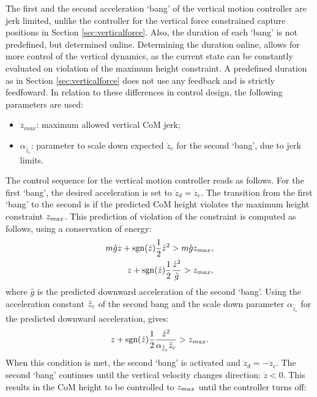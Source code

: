 The first and the second acceleration `bang' of the vertical motion controller are jerk limited, unlike the controller for the vertical force constrained capture positions in Section \ref{sec:verticalforce}. Also, the duration of each `bang' is not predefined, but determined online. Determining the duration online, allows for more control of the vertical dynamics, as the current state can be constantly evaluated on violation of the maximum height constraint. A predefined duration as in Section \ref{sec:verticalforce} does not use any feedback and is strictly feedfoward. In relation to these differences in control design, the following parameters are used:
\begin{itemize}
	\item $\dddot{z}_{max}$: maximum allowed vertical CoM jerk;
	\item $\alpha_{\hat{\ddot{z}}_{c}}$: parameter to scale down expected $\ddot{z}_c$ for the second `bang', due to jerk limits.
\end{itemize}
The control sequence for the vertical motion controller reads as follows. For the first `bang', the desired acceleration is set to $\ddot{z}_d=\ddot{z}_c$. The transition from the first `bang' to the second is if the predicted \ac{CoM} height violates the maximum height constraint $z_{max}$. This prediction of violation of the constraint is computed as follows, using a conservation of energy:
\begin{align}
	m\hat{g}z + \operatorname{sgn}(\dot{z})\frac{1}{2}\dot{z}^2>m\hat{g}z_{max},\\
	z + \operatorname{sgn}(\dot{z})\frac{1}{2}\frac{\dot{z}^2}{\hat{g}}>z_{max},
\end{align}
where $\hat{g}$ is the predicted downward acceleration of the second `bang'. Using the acceleration constant $\ddot{z}_{c}$ of the second bang and the scale down parameter $\alpha_{\hat{\ddot{z}}_{c}}$ for the predicted downward acceleration, gives:
\begin{equation}
	z+\operatorname{sgn}(\dot{z})\frac{1}{2}\frac{\dot{z}^2}{\alpha_{\hat{\ddot{z}}_{c}}\ddot{z}_{c}} >z_{max}.
\end{equation}
When this condition is met, the second `bang' is activated and $\ddot{z}_d=-\ddot{z}_c$. The second `bang' continues until the vertical velocity changes direction: $\dot{z}<0$. This results in the \ac{CoM} height to be controlled to $z_{max}$ until the controller turns off:
